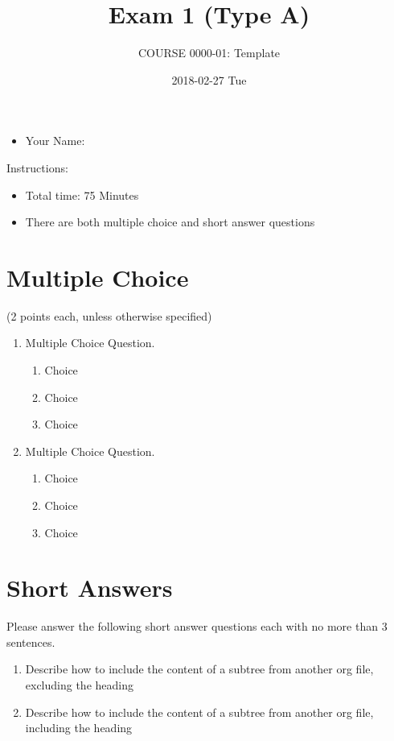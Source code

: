 \documentclass[article,letterpaper,times,10pt,listings-bw,microtype]{article}
\author{COURSE 0000-01: Template}
\date{2018-02-27 Tue}
\title{Exam 1 (Type A)}
\begin{document}
\maketitle
\vspace{20 mm}

\begin{itemize}
\item Your Name: \underline{\hspace{4cm}}
\end{itemize}

\vspace{20 mm}

Instructions:

\begin{itemize}
\item Total time: 75 Minutes
\item There are both multiple choice and short answer questions
\end{itemize}
\clearpage
\section*{Multiple Choice}
\label{sec:orga6a8bdb}
(2 points each, unless otherwise specified)
\begin{enumerate}
\item Multiple Choice Question.
\begin{enumerate}
\item Choice
\item Choice
\item Choice
\end{enumerate}

\item Multiple Choice Question.
\begin{enumerate}
\item Choice
\item Choice
\item Choice
\end{enumerate}
\end{enumerate}
\clearpage
\section*{Short Answers}
\label{sec:org9357a33}
\begin{mdframed}[style=exampledefault, frametitle={}]
Please answer the following short answer questions each with no more than 3
sentences.
\end{mdframed}

\begin{enumerate}
\item Describe how to include the content of a subtree from another org file, excluding the heading

\vspace{50 mm}

\item Describe how to include the content of a subtree from another org file, including the heading
\end{enumerate}
\end{document}
